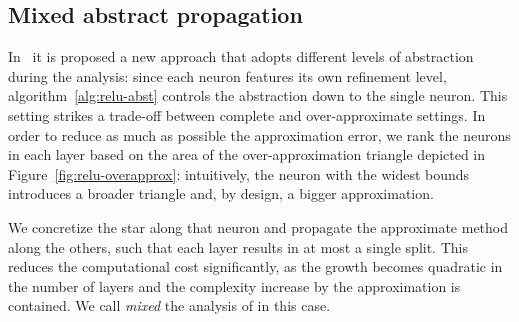 \subsection{Mixed abstract propagation}

In~\cite{guidotti2021pynever} it is proposed a new approach that adopts 
different levels of abstraction during the analysis: since each neuron
features its own refinement level, algorithm~\ref{alg:relu-abst}
controls the abstraction down to the single neuron. This setting strikes
a trade-off between complete and over-approximate settings. In order to
reduce as much as possible the approximation error, we rank the
neurons in each layer based on the area of the over-approximation
triangle depicted in Figure~\ref{fig:relu-overapprox}: intuitively,
the neuron with the widest bounds introduces a broader triangle and,
by design, a bigger approximation. 

We concretize the star along that neuron and propagate the approximate 
method along the others, such that each layer results in at most a single 
split. This reduces the computational cost significantly, as the growth 
becomes quadratic in the number of layers and the complexity increase by 
the approximation is contained. We call \textit{mixed} the analysis of 
\nevertwo{} in this case.